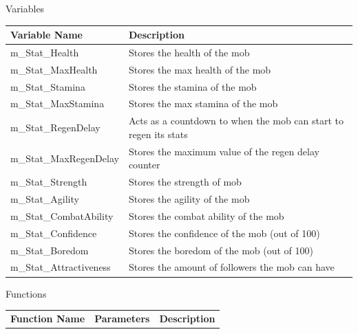 \documentclass{article}
\begin{document}
                \begin{center}
                    Variables
                    \begin{tabular}{ | m{} | m{} | }
                        \hline
                        \textbf{Variable Name} & \textbf{Description} \\
                        \hline
                        m\_Stat\_Health & Stores the health of the mob \\
                        \hline
                        m\_Stat\_MaxHealth & Stores the max health of the mob \\
                        \hline
                        m\_Stat\_Stamina & Stores the stamina of the mob \\
                        \hline
                        m\_Stat\_MaxStamina & Stores the max stamina of the mob \\
                        \hline
                        m\_Stat\_RegenDelay & Acts as a countdown to when the mob can start to regen its stats\\
                        \hline
                        m\_Stat\_MaxRegenDelay & Stores the maximum value of the regen delay counter\\
                        \hline
                        m\_Stat\_Strength & Stores the strength of mob \\
                        \hline
                        m\_Stat\_Agility & Stores the agility of the mob \\
                        \hline
                        m\_Stat\_CombatAbility & Stores the combat ability of the mob \\
                        \hline
                        m\_Stat\_Confidence & Stores the confidence of the mob (out of 100) \\
                        \hline
                        m\_Stat\_Boredom & Stores the boredom of the mob (out of 100) \\
                        \hline
                        m\_Stat\_Attractiveness & Stores the amount of followers the mob can have \\
                        \hline
                    \end{tabular}
                    Functions
                    \begin{tabular}{ | m{} | m{}| m{} | }
                        \hline
                        \textbf{Function Name} & \textbf{Parameters} & \textbf{Description} \\

\end{tabular}
\end{center}
\end{document}
